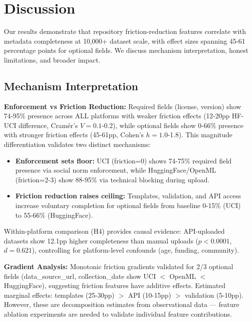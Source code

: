 \section{Discussion}
\label{sec:discussion}

Our results demonstrate that repository friction-reduction features correlate with metadata completeness at 10,000+ dataset scale, with effect sizes spanning 45-61 percentage points for optional fields. We discuss mechanism interpretation, honest limitations, and broader impact.

\subsection{Mechanism Interpretation}

\textbf{Enforcement vs Friction Reduction:} Required fields (license, version) show 74-95\% presence across ALL platforms with weaker friction effects (12-20pp HF-UCI difference, Cramér's $V=0.1$-0.2), while optional fields show 0-66\% presence with stronger friction effects (45-61pp, Cohen's $h=1.0$-1.8). This magnitude differentiation validates two distinct mechanisms:

\begin{itemize}
\item \textbf{Enforcement sets floor:} UCI (friction=0) shows 74-75\% required field presence via social norm enforcement, while HuggingFace/OpenML (friction=2-3) show 88-95\% via technical blocking during upload.
\item \textbf{Friction reduction raises ceiling:} Templates, validation, and API access increase voluntary completion for optional fields from baseline 0-15\% (UCI) to 55-66\% (HuggingFace).
\end{itemize}

Within-platform comparison (H4) provides causal evidence: API-uploaded datasets show 12.1pp higher completeness than manual uploads ($p<0.0001$, $d=0.621$), controlling for platform-level confounds (age, funding, community).

\textbf{Gradient Analysis:} Monotonic friction gradients validated for 2/3 optional fields (data\_source\_url, collection\_date show UCI $<$ OpenML $<$ HuggingFace), suggesting friction features have additive effects. Estimated marginal effects: templates (25-30pp) $>$ API (10-15pp) $>$ validation (5-10pp). However, these are decomposition estimates from observational data --- feature ablation experiments are needed to validate individual feature contributions.

